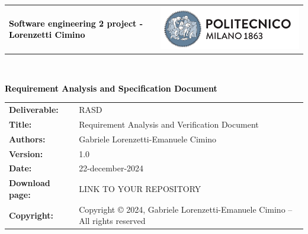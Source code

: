 \documentclass[11pt,twoside]{article}
\begin{document}
\begin{titlepage}
{\begin{table}[t!]
\centering
\begin{tabu} to \textwidth { X[1.3,r,p] X[1.7,l,p] }
\textcolor{Black}
{\textbf{\small{Software engineering 2 project -  Lorenzetti Cimino}}} & \includegraphics[scale=0.5]{Images/PolimiLogo}
\end{tabu}
\end{table}}~\\ [7cm]

\begin{flushleft}
{\textcolor{Black}{\textbf{\Huge{Requirement Analysis and Specification
        Document}}}} \\ [1cm]
\end{flushleft}
\end{titlepage}

\begin{table}[h!]
\begin{tabu} to \textwidth { X[0.3,r,p] X[0.7,l,p] }
\hline
\textbf{Deliverable:} & RASD\\
\textbf{Title:} & Requirement Analysis and Verification Document \\
\textbf{Authors:} & Gabriele Lorenzetti-Emanuele Cimino \\
\textbf{Version:} & 1.0 \\ 
\textbf{Date:} & 22-december-2024 \\
\textbf{Download page:} & LINK TO YOUR REPOSITORY \\
\textbf{Copyright:} & Copyright © 2024, Gabriele Lorenzetti-Emanuele Cimino – All rights reserved \\
\hline
\end{tabu}
\end{table}

\setcounter{page}{2}

\newpage
{}
\tableofcontents
\newpage
{}
\listoffigures
{}
\listoftables
\end{document}
